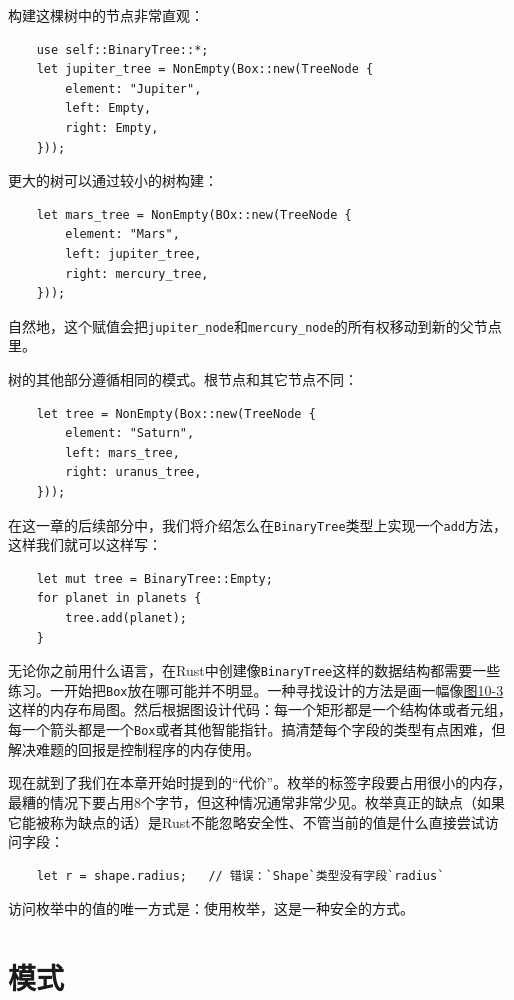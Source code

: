 构建这棵树中的节点非常直观：
\begin{verbatim}
    use self::BinaryTree::*;
    let jupiter_tree = NonEmpty(Box::new(TreeNode {
        element: "Jupiter",
        left: Empty,
        right: Empty,
    }));
\end{verbatim}

更大的树可以通过较小的树构建：
\begin{verbatim}
    let mars_tree = NonEmpty(BOx::new(TreeNode {
        element: "Mars",
        left: jupiter_tree,
        right: mercury_tree,
    }));
\end{verbatim}

自然地，这个赋值会把\texttt{jupiter\_node}和\texttt{mercury\_node}的所有权移动到新的父节点里。

树的其他部分遵循相同的模式。根节点和其它节点不同：
\begin{verbatim}
    let tree = NonEmpty(Box::new(TreeNode {
        element: "Saturn",
        left: mars_tree,
        right: uranus_tree,
    }));
\end{verbatim}

在这一章的后续部分中，我们将介绍怎么在\texttt{BinaryTree}类型上实现一个\texttt{add}方法，这样我们就可以这样写：
\begin{verbatim}
    let mut tree = BinaryTree::Empty;
    for planet in planets {
        tree.add(planet);
    }
\end{verbatim}

无论你之前用什么语言，在Rust中创建像\texttt{BinaryTree}这样的数据结构都需要一些练习。一开始把\texttt{Box}放在哪可能并不明显。一种寻找设计的方法是画一幅像\hyperref[f10-3]{图10-3}这样的内存布局图。然后根据图设计代码：每一个矩形都是一个结构体或者元组，每一个箭头都是一个\texttt{Box}或者其他智能指针。搞清楚每个字段的类型有点困难，但解决难题的回报是控制程序的内存使用。 

现在就到了我们在本章开始时提到的“代价”。枚举的标签字段要占用很小的内存，最糟的情况下要占用8个字节，但这种情况通常非常少见。枚举真正的缺点（如果它能被称为缺点的话）是Rust不能忽略安全性、不管当前的值是什么直接尝试访问字段：
\begin{verbatim}
    let r = shape.radius;   // 错误：`Shape`类型没有字段`radius`
\end{verbatim}

访问枚举中的值的唯一方式是：使用枚举，这是一种安全的方式。

\section{模式}

